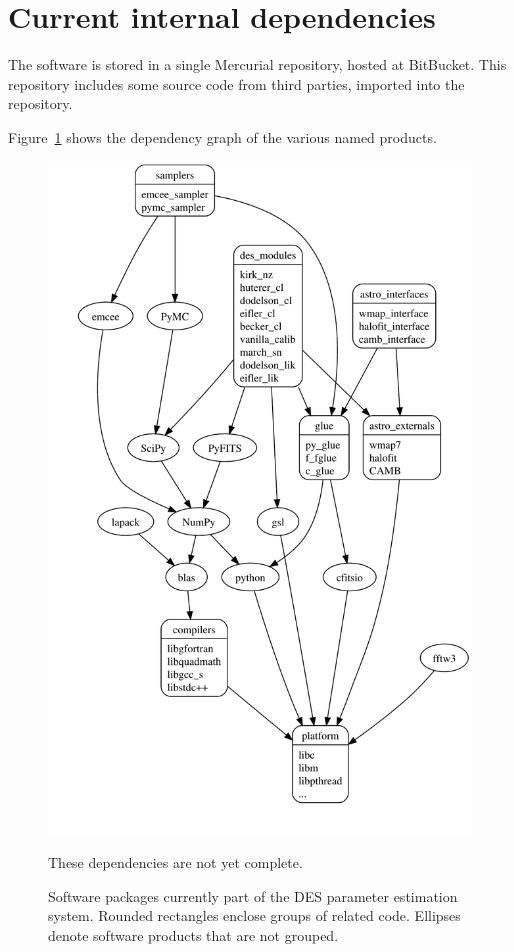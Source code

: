 \documentclass[draftmode,draftwater]{memarticle}
\newcommand{\despipe}{\name{des-pipe}\xspace}
\begin{document}
\section{Current internal dependencies}

The \despipe software is stored in a single
Mercurial\cite{mercurial} repository, hosted at
BitBucket\cite{bitbucket}. This repository includes some source code
from third parties, imported into the repository.

Figure~\ref{fig:astropackages} shows the dependency graph of the various
named products.

\begin{figure}
  \centering
  \includegraphics[height=0.95\textheight]{astro_packages}
  \begin{fixme}
    These dependencies are not yet complete.
  \end{fixme}
  \caption{Software packages currently part of the DES parameter
    estimation system. Rounded rectangles enclose groups of related
    code. Ellipses denote software products that are not grouped.}
  \label{fig:astropackages}
\end{figure}
\end{document}
